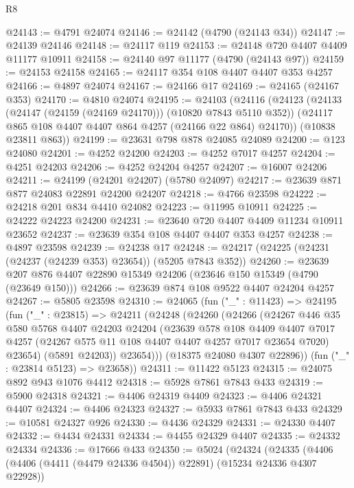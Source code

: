 \begin{lexlean}{R8}
\begin{coremodule}
@24143 := @4791 @24074
@24146 := @24142 (@4790 (@24143 @34))
@24147 := @24139 @24146
@24148 := @24117 @119
@24153 := @24148 @720 @4407 @4409 @11177 @10911
@24158 := @24140 @97 @11177 (@4790 (@24143 @97))
@24159 := @24153 @24158
@24165 := @24117 @354 @108 @4407 @4407 @353 @4257
@24166 := @4897 @24074
@24167 := @24166 @17
@24169 := @24165 (@24167 @353)
@24170 := @4810 @24074
@24195 := @24103
    (@24116
      (@24123
        (@24133 (@24147 (@24159 (@24169 @24170))) (@10820 @7843 @5110 @352))
        (@24117 @865 @108 @4407 @4407 @864 @4257 (@24166 @22 @864) @24170))
      (@10838 @23811 @863))
@24199 := @23631 @798 @878 @24085 @24089
@24200 := @123 @24080
@24201 := @4252 @24200
@24203 := @4252 @7017 @4257
@24204 := @4251 @24203
@24206 := @4252 @24204 @4257
@24207 := @16007 @24206
@24211 := @24199 (@24201 @24207) (@5780 @24097)
@24217 := @23639 @871 @877 @24083 @22891 @24200 @24207
@24218 := @4766 @23598
@24222 := @24218 @201 @834 @4410 @24082
@24223 := @11995 @10911
@24225 := @24222 @24223 @24200
@24231 := @23640 @720 @4407 @4409 @11234 @10911 @23652
@24237 := @23639 @354 @108 @4407 @4407 @353 @4257
@24238 := @4897 @23598
@24239 := @24238 @17
@24248 := @24217 (@24225 (@24231 (@24237 (@24239 @353) @23654)) (@5205 @7843 @352))
@24260 := @23639 @207 @876 @4407 @22890 @15349 @24206 (@23646 @150 @15349 (@4790 (@23649 @150)))
@24266 := @23639 @874 @108 @9522 @4407 @24204 @4257
@24267 := @5805 @23598
@24310 := @24065
    (fun ("_" : @11423) =>
    @24195
      (fun ("_" : @23815) =>
      @24211
        (@24248
          (@24260
            (@24266
              (@24267
                @446
                @35
                @580
                @5768
                @4407
                @24203
                @24204
                (@23639
                  @578
                  @108
                  @4409
                  @4407
                  @7017
                  @4257
                  (@24267 @575 @11 @108 @4407 @4407 @4257 @7017 @23654 @7020)
                  @23654)
                (@5891 @24203))
              @23654)))
        (@18375 @24080 @4307 @22896))
      (fun ("_" : @23814 @5123) => @23658))
@24311 := @11422 @5123
@24315 := @24075 @892 @943 @1076 @4412
@24318 := @5928 @7861 @7843 @433
@24319 := @5900 @24318
@24321 := @4406 @24319 @4409
@24323 := @4406 @24321 @4407
@24324 := @4406 @24323
@24327 := @5933 @7861 @7843 @433
@24329 := @10581 @24327 @926
@24330 := @4436 @24329
@24331 := @24330 @4407
@24332 := @4434 @24331
@24334 := @4455 @24329 @4407
@24335 := @24332 @24334
@24336 := @17666 @433
@24350 := @5024
    (@24324
      (@24335
        (@4406 (@4406 (@4411 (@4479 @24336 @4504)) @22891) (@15234 @24336 @4307 @22928))

\end{coremodule}
\end{lexlean}
